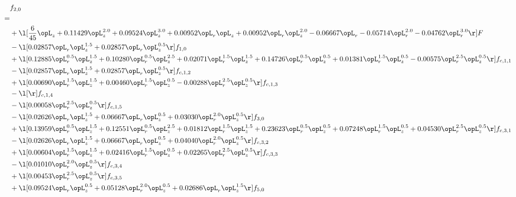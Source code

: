 \begin{alignat}{2} 
\label{eq:f_20_1} 
& f_{2,0} \nonumber \\ 
 = \\ 
& + \l[ \frac{6}{45} \opL_z +  0.11429 \opL_z^{2.0} +  0.09524 \opL_z^{3.0} +  0.00952 \opL_r \opL_z +  0.00952 \opL_r \opL_z^{2.0}   -0.06667 \opL_r   -0.05714 \opL_r^{2.0}   -0.04762 \opL_r^{3.0}  \r] F \nonumber \\ 
& - \l[  0.02857 \opL_r \opL_z^{1.5} +  0.02857 \opL_r \opL_z^{0.5}  \r] f_{1,0} \nonumber \\ 
& + \l[  0.12885 \opL_r^{0.5} \opL_z^{1.5} +  0.10280 \opL_r^{0.5} \opL_z^{2.5} +  0.02071 \opL_r^{1.5} \opL_z^{1.5} +  0.14726 \opL_r^{0.5} \opL_z^{0.5} +  0.01381 \opL_r^{1.5} \opL_z^{0.5}   -0.00575 \opL_r^{2.5} \opL_z^{0.5}  \r] f_{c,1,1} \nonumber \\ 
& - \l[  0.02857 \opL_r \opL_z^{1.5} +  0.02857 \opL_r \opL_z^{0.5}  \r] f_{c,1,2} \nonumber \\ 
& + \l[  0.00690 \opL_r^{1.5} \opL_z^{1.5} +  0.00460 \opL_r^{1.5} \opL_z^{0.5}   -0.00288 \opL_r^{2.5} \opL_z^{0.5}  \r] f_{c,1,3} \nonumber \\ 
& - \l[  \r] f_{c,1,4} \nonumber \\ 
& - \l[  0.00058 \opL_r^{2.5} \opL_z^{0.5}  \r] f_{c,1,5} \nonumber \\ 
& - \l[  0.02626 \opL_r \opL_z^{1.5} +  0.06667 \opL_r \opL_z^{0.5} +  0.03030 \opL_r^{2.0} \opL_z^{0.5}  \r] f_{3,0} \nonumber \\ 
& + \l[  0.13959 \opL_r^{0.5} \opL_z^{1.5} +  0.12551 \opL_r^{0.5} \opL_z^{2.5} +  0.01812 \opL_r^{1.5} \opL_z^{1.5} +  0.23623 \opL_r^{0.5} \opL_z^{0.5} +  0.07248 \opL_r^{1.5} \opL_z^{0.5} +  0.04530 \opL_r^{2.5} \opL_z^{0.5}  \r] f_{c,3,1} \nonumber \\ 
& - \l[  0.02626 \opL_r \opL_z^{1.5} +  0.06667 \opL_r \opL_z^{0.5} +  0.04040 \opL_r^{2.0} \opL_z^{0.5}  \r] f_{c,3,2} \nonumber \\ 
& + \l[  0.00604 \opL_r^{1.5} \opL_z^{1.5} +  0.02416 \opL_r^{1.5} \opL_z^{0.5} +  0.02265 \opL_r^{2.5} \opL_z^{0.5}  \r] f_{c,3,3} \nonumber \\ 
& - \l[  0.01010 \opL_r^{2.0} \opL_z^{0.5}  \r] f_{c,3,4} \nonumber \\ 
& + \l[  0.00453 \opL_r^{2.5} \opL_z^{0.5}  \r] f_{c,3,5} \nonumber \\ 
& + \l[  0.09524 \opL_r \opL_z^{0.5} +  0.05128 \opL_r^{2.0} \opL_z^{0.5} +  0.02686 \opL_r \opL_z^{1.5}  \r] f_{5,0} \nonumber \\ 

\end{alignat}
